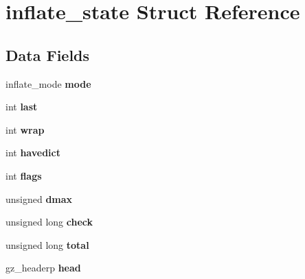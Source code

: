 \hypertarget{structinflate__state}{}\section{inflate\+\_\+state Struct Reference}
\label{structinflate__state}
\subsection*{Data Fields}
\begin{DoxyCompactItemize}
\item 
\mbox{\label{structinflate__state_a9c7906fee7eeeb450b13576531ca639d}} 
inflate\+\_\+mode {\bfseries mode}
\item 
\mbox{\label{structinflate__state_ab3cbcd2c5ff3b0b8b34ef402a13afdf7}} 
int {\bfseries last}
\item 
\mbox{\label{structinflate__state_a990d157b5c0d4ba178c3361de9ce6561}} 
int {\bfseries wrap}
\item 
\mbox{\label{structinflate__state_a2eb1cd634ed6baade952ffa5938ebcdc}} 
int {\bfseries havedict}
\item 
\mbox{\label{structinflate__state_a9dcf6151443750d75b2283d0a3e62c39}} 
int {\bfseries flags}
\item 
\mbox{\label{structinflate__state_ae3d433011714e673b22e82156acc4416}} 
unsigned {\bfseries dmax}
\item 
\mbox{\label{structinflate__state_ae597e4f5c37b9f7881015384bf826371}} 
unsigned long {\bfseries check}
\item 
\mbox{\label{structinflate__state_af9d1071eb75b1ee37a151ccec8dfee95}} 
unsigned long {\bfseries total}
\item 
\mbox{\label{structinflate__state_aac35b33a559009eb4bc0e2bdd8e9b5c6}} 
gz\+\_\+headerp {\bfseries head}
\item 
\mbox{\label{structinflate__state_a71f844b589ac450f17d69f3692a8c5cc}} 

\end{DoxyCompactItemize}
